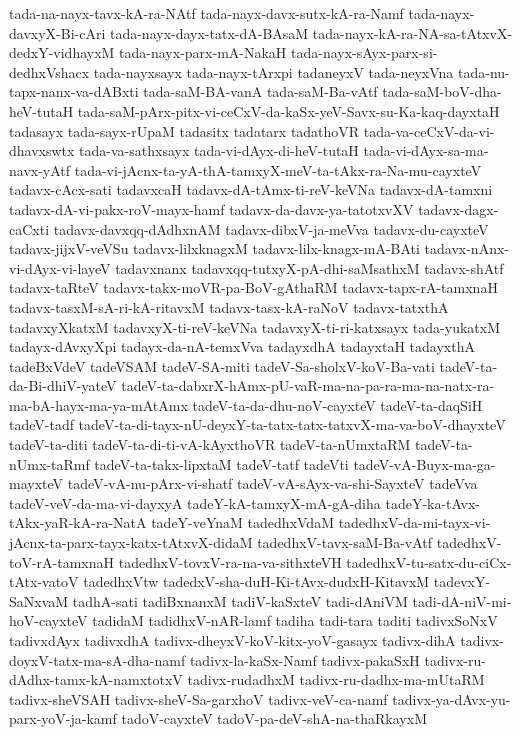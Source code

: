 {tada-na-nayx-tavx-kA-ra-NAtf
tada-nayx-davx-sutx-kA-ra-Namf
tada-nayx-davxyX-Bi-cAri
tada-nayx-dayx-tatx-dA-BAsaM
tada-nayx-kA-ra-NA-sa-tAtxvX-dedxY-vidhayxM
tada-nayx-parx-mA-NakaH
tada-nayx-sAyx-parx-si-dedhxVshacx
tada-nayxsayx
tada-nayx-tArxpi
tadaneyxV
tada-neyxVna
tada-nu-tapx-nanx-va-dABxti
tada-saM-BA-vanA
tada-saM-Ba-vAtf
tada-saM-boV-dha-heV-tutaH
tada-saM-pArx-pitx-vi-ceCxV-da-kaSx-yeV-Savx-su-Ka-kaq-dayxtaH
tadasayx
tada-sayx-rUpaM
tadasitx
tadatarx
tadathoVR
tada-va-ceCxV-da-vi-dhavxswtx
tada-va-sathxsayx
tada-vi-dAyx-di-heV-tutaH
tada-vi-dAyx-sa-ma-navx-yAtf
tada-vi-jAcnx-ta-yA-thA-tamxyX-meV-ta-tAkx-ra-Na-mu-cayxteV
tadavx-cAcx-sati
tadavxcaH
tadavx-dA-tAmx-ti-reV-keVNa
tadavx-dA-tamxni
tadavx-dA-vi-pakx-roV-mayx-hamf
tadavx-da-davx-ya-tatotxvXV
tadavx-dagx-caCxti
tadavx-davxqq-dAdhxnAM
tadavx-dibxV-ja-meVva
tadavx-du-cayxteV
tadavx-jijxV-veVSu
tadavx-lilxknagxM
tadavx-lilx-knagx-mA-BAti
tadavx-nAnx-vi-dAyx-vi-layeV
tadavxnanx
tadavxqq-tutxyX-pA-dhi-saMsathxM
tadavx-shAtf
tadavx-taRteV
tadavx-takx-moVR-pa-BoV-gAthaRM
tadavx-tapx-rA-tamxnaH
tadavx-tasxM-sA-ri-kA-ritavxM
tadavx-tasx-kA-raNoV
tadavx-tatxthA
tadavxyXkatxM
tadavxyX-ti-reV-keVNa
tadavxyX-ti-ri-katxsayx
tada-yukatxM
tadayx-dAvxyXpi
tadayx-da-nA-temxVva
tadayxdhA
tadayxtaH
tadayxthA
tadeBxVdeV
tadeVSAM
tadeV-SA-miti
tadeV-Sa-sholxV-koV-Ba-vati
tadeV-ta-da-Bi-dhiV-yateV
tadeV-ta-dabxrX-hAmx-pU-vaR-ma-na-pa-ra-ma-na-natx-ra-ma-bA-hayx-ma-ya-mAtAmx
tadeV-ta-da-dhu-noV-cayxteV
tadeV-ta-daqSiH
tadeV-tadf
tadeV-ta-di-tayx-nU-deyxY-ta-tatx-tatx-tatxvX-ma-va-boV-dhayxteV
tadeV-ta-diti
tadeV-ta-di-ti-vA-kAyxthoVR
tadeV-ta-nUmxtaRM
tadeV-ta-nUmx-taRmf
tadeV-ta-takx-lipxtaM
tadeV-tatf
tadeVti
tadeV-vA-Buyx-ma-ga-mayxteV
tadeV-vA-nu-pArx-vi-shatf
tadeV-vA-sAyx-va-shi-SayxteV
tadeVva
tadeV-veV-da-ma-vi-dayxyA
tadeY-kA-tamxyX-mA-gA-diha
tadeY-ka-tAvx-tAkx-yaR-kA-ra-NatA
tadeY-veYnaM
tadedhxVdaM
tadedhxV-da-mi-tayx-vi-jAcnx-ta-parx-tayx-katx-tAtxvX-didaM
tadedhxV-tavx-saM-Ba-vAtf
tadedhxV-toV-rA-tamxnaH
tadedhxV-tovxV-ra-na-va-sithxteVH
tadedhxV-tu-satx-du-ciCx-tAtx-vatoV
tadedhxVtw
tadedxV-sha-duH-Ki-tAvx-dudxH-KitavxM
tadevxY-SaNxvaM
tadhA-sati
tadiBxnanxM
tadiV-kaSxteV
tadi-dAniVM
tadi-dA-niV-mi-hoV-cayxteV
tadidaM
tadidhxV-nAR-lamf
tadiha
tadi-tara
taditi
tadivxSoNxV
tadivxdAyx
tadivxdhA
tadivx-dheyxV-koV-kitx-yoV-gasayx
tadivx-dihA
tadivx-doyxV-tatx-ma-sA-dha-namf
tadivx-la-kaSx-Namf
tadivx-pakaSxH
tadivx-ru-dAdhx-tamx-kA-namxtotxV
tadivx-rudadhxM
tadivx-ru-dadhx-ma-mUtaRM
tadivx-sheVSAH
tadivx-sheV-Sa-garxhoV
tadivx-veV-ca-namf
tadivx-ya-dAvx-yu-parx-yoV-ja-kamf
tadoV-cayxteV
tadoV-pa-deV-shA-na-thaRkayxM
}

